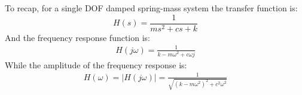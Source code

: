 \documentclass[12pt,letter]{article}
\begin{document}







\begin{review}
	To recap, for a single DOF damped spring-mass system the transfer function is:
	\begin{equation}
	H(s) = \frac{1}{ms^2+cs+k}
	\end{equation}
	And the frequency response function is: 
	\begin{eqnarray}
	H(j\omega) = \frac{1}{k-m\omega^2+c\omega j}
	\end{eqnarray}
	While the amplitude of the frequency response is:
	\begin{eqnarray}
	H(\omega) = |H(j\omega)| = \frac{1}{\sqrt{(k-m\omega^2)^2+c^2\omega^2}}
	\end{eqnarray}
\end{review}
\end{document}
